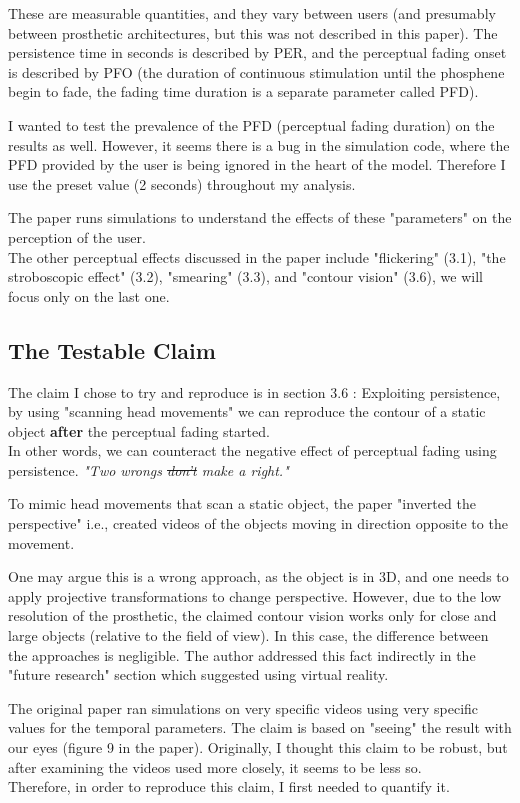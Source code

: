 \documentclass[]{article}
\begin{document}
These are measurable quantities, and they vary between users (and presumably between prosthetic architectures, but this was not described in this paper). The persistence time in seconds is described by PER, and the perceptual fading onset is described by PFO (the duration of continuous stimulation until the phosphene begin to fade, the fading time duration is a separate parameter called PFD).\\

\begin{remark}
	I wanted to test the prevalence of the PFD (perceptual fading duration) on the results as well. However, it seems there is a bug in the simulation code, where the PFD provided by the user is being ignored in the heart of the model. Therefore I use the preset value (2 seconds) throughout my analysis.
\end{remark}

The paper runs simulations to understand the effects of these "parameters" on the perception of the user. \\

The other perceptual effects discussed in the paper include "flickering" (3.1), "the stroboscopic effect" (3.2), "smearing" (3.3), and "contour vision" (3.6), we will focus only on the last one.
\subsection{The Testable Claim}
The claim I chose to try and reproduce is in section 3.6 : Exploiting persistence, by using "scanning head movements" we can reproduce the contour of a static object {\bf after} the perceptual fading started. \\
In other words, we can counteract the negative effect of perceptual fading using persistence. {\it "Two wrongs \sout{don't} make a right."}

To mimic head movements that scan a static object, the paper "inverted the perspective" i.e., created videos of the objects moving in direction opposite to the movement. 
\begin{remark}
	One may argue this is a wrong approach, as the object is in 3D, and one needs to apply projective transformations to change perspective. However, due to the low resolution of the prosthetic, the claimed contour vision works only for close and large objects (relative to the field of view). In this case, the difference between the approaches is negligible. The author addressed this fact indirectly in the "future research" section which suggested using virtual reality.
\end{remark}
The original paper ran simulations on very specific videos using very specific values for the temporal parameters. The claim is based on "seeing" the result with our eyes (figure 9 in the paper). Originally, I thought this claim to be robust, but after examining the videos used more closely, it seems to be less so. \\
Therefore, in order to reproduce this claim, I first needed to quantify it.
\end{document}

